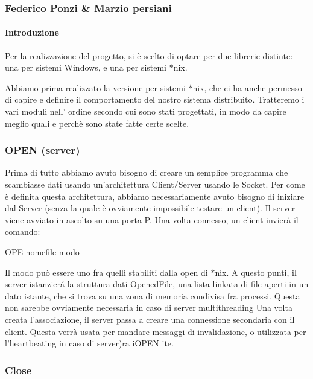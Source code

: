 \subsubsection*{Federico Ponzi \& Marzio persiani}

\paragraph*{Introduzione}

Per la realizzazione del progetto, si è scelto di optare per due librerie distinte\+: una per sistemi Windows, e una per sistemi $\ast$nix.

Abbiamo prima realizzato la versione per sistemi $\ast$nix, che ci ha anche permesso di capire e definire il comportamento del nostro sistema distribuito. Tratteremo i vari moduli nell' ordine secondo cui sono stati progettati, in modo da capire meglio quali e perchè sono state fatte certe scelte.

\subsubsection*{O\+P\+E\+N (server)}

Prima di tutto abbiamo avuto bisogno di creare un semplice programma che scambiasse dati usando un'architettura Client/\+Server usando le Socket. Per come è definita questa architettura, abbiamo necessariamente avuto bisogno di iniziare dal Server (senza la quale è ovviamente impossibile testare un client). Il server viene avviato in ascolto su una porta P. Una volta connesso, un client invierà il comando\+: \begin{DoxyVerb}OPE nomefile modo
\end{DoxyVerb}


Il modo può essere uno fra quelli stabiliti dalla open di $\ast$nix. A questo punti, il server istanzierá la struttura dati \hyperlink{structOpenedFile}{Opened\+File}, una lista linkata di file aperti in un dato istante, che si trova su una zona di memoria condivisa fra processi. Questa non sarebbe ovviamente necessaria in caso di server multithreading Una volta creata l'associazione, il server passa a creare una connessione secondaria con il client. Questa verrà usata per mandare messaggi di invalidazione, o utilizzata per l'heartbeating in caso di server)ra i\+O\+P\+E\+N ite.

\subsubsection*{Close}

